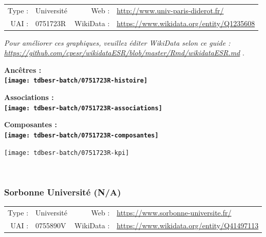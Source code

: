 \documentclass[12pt,french,]{article}
\begin{document}
\begin{tabular*}{\textwidth}{rp{5cm}rl}  
\hline  
Type : & Université & Web : &\href{http://www.univ-paris-diderot.fr/}{http://www.univ-paris-diderot.fr/} \\  
UAI : & 0751723R & WikiData : & \href{https://www.wikidata.org/entity/Q1235608}{https://www.wikidata.org/entity/Q1235608} \\  
\hline  
\end{tabular*}

\textit{\scriptsize Pour améliorer ces graphiques, veuillez éditer WikiData selon ce guide :  \href{https://github.com/cpesr/wikidataESR/blob/master/Rmd/wikidataESR.md}{https://github.com/cpesr/wikidataESR/blob/master/Rmd/wikidataESR.md}}
.

\vspace{1cm}  
\begin{minipage}[b]{0.50\textwidth}\begin{center} \bf Ancêtres : \\  
\texttt{[image: tdbesr-batch/0751723R-histoire]} \end{center}\end{minipage}\begin{minipage}[b]{0.50\textwidth}\begin{center} \bf Associations : \\  
\texttt{[image: tdbesr-batch/0751723R-associations]} \end{center}\end{minipage}

\hrulefill

\begin{center} \bf Composantes : \\  
\texttt{[image: tdbesr-batch/0751723R-composantes]} \end{center}

\begin{center}\texttt{[image: tdbesr-batch/0751723R-kpi]} \end{center}\checkoddpage

\ifoddpage \fi ~\newpage  

\hypertarget{sorbonne-universituxe9-na}{%
\subsubsection{Sorbonne Université
(N/A)}\label{sorbonne-universituxe9-na}}

\begin{tabular*}{\textwidth}{rp{5cm}rl}  
\hline  
Type : & Université & Web : &\href{https://www.sorbonne-universite.fr/}{https://www.sorbonne-universite.fr/} \\  
UAI : & 0755890V & WikiData : & \href{https://www.wikidata.org/entity/Q41497113}{https://www.wikidata.org/entity/Q41497113} \\  
\hline  
\end{tabular*}
\end{document}
